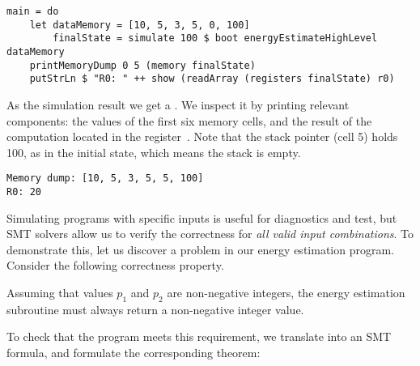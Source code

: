 \vspace{1mm}
\begin{verbatim}
main = do
    let dataMemory = [10, 5, 3, 5, 0, 100]
        finalState = simulate 100 $ boot energyEstimateHighLevel dataMemory
    printMemoryDump 0 5 (memory finalState)
    putStrLn $ "R0: " ++ show (readArray (registers finalState) r0)
\end{verbatim}
\vspace{1mm}

\noindent
As the simulation result we get a . We inspect it by
printing relevant components: the values of the first six memory cells, and the
result of the computation located in the register~. Note that the stack
pointer (cell 5) holds 100, as in the initial state, which means the stack is empty.

\vspace{1mm}
\begin{verbatim}
Memory dump: [10, 5, 3, 5, 5, 100]
R0: 20
\end{verbatim}
\vspace{1mm}

Simulating programs with specific inputs is useful for diagnostics and test, but
SMT solvers allow us to verify the correctness for \emph{all valid input
combinations}. To demonstrate this, let us discover a problem in our energy
estimation program. Consider the following correctness property.


\vspace{1mm}
\begin{tcolorbox}
Assuming that values $p_1$ and $p_2$ are non-negative integers, the energy
estimation subroutine must always return a non-negative integer value.
\end{tcolorbox}
\vspace{1mm}

To check that the program meets this requirement, we translate
 into an SMT formula,
and formulate the corresponding theorem:

